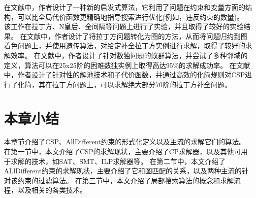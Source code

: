 在文献\cite{codognet2001yet}中，作者设计了一种新的启发式算法，它利用了问题在约束和变量方面的结构，可以比全局代价函数更精确地指导搜索进行优化(例如，违反约束的数量)。
该工作在拉丁方、N皇后、全间隔等问题上进行了实验，并且取得了较好的实验结果。
在文献\cite{DBLP:journals/tec/JinH19}中，作者设计了将拉丁方问题转化为图的方法，从而将问题归约到图着色问题上，并使用遗传算法，对给定补全拉丁方实例进行求解，取得了较好的求解效率。
在文献\cite{lloyd2020antcolony}中，作者设计了针对数独问题的蚁群算法，并尝试了多种邻域的定义，算法可以在25x25阶的困难数独实例上取得高达95\%的求解成功率。
在文献\cite{pan2022fast}中，作者设计了针对性的解池技术和子代价函数，并通过高效的化简规则对CSP进行了化简，其在拉丁方问题上，可以求解绝大部分70阶的拉丁方补全问题。


\section{本章小结}

本章节介绍了CSP、AllDifferent约束的形式化定义以及主流的求解它们的算法。
在第一节中，本文介绍了CSP的求解现状，主要介绍了CP求解器，以及其他可用于求解的技术，如SAT、SMT、ILP求解器等。
在第二节中，本文介绍了ALlDifferent约束的求解现状，主要介绍了它和图匹配的关系，以及两种主流的针对该约束的过滤算法。
在第三节中，本文介绍了局部搜索算法的概念和求解流程，以及相关的各类技术。